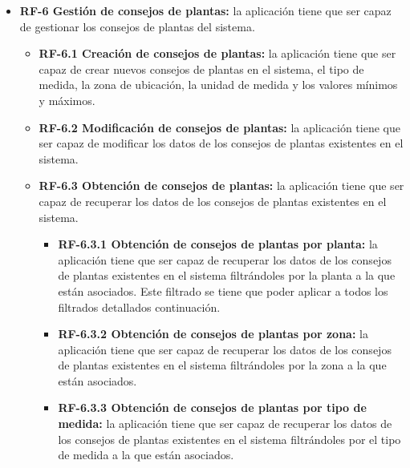 \begin{itemize}
        \item \textbf{RF-6 Gestión de consejos de plantas:} la aplicación tiene que ser capaz de gestionar los consejos de plantas del sistema.
            \begin{itemize}
                \item \textbf{RF-6.1 Creación de consejos de plantas:} la aplicación tiene que ser capaz de crear nuevos consejos de plantas en el sistema, el tipo de medida, la zona de ubicación,  la unidad de medida y los valores mínimos y máximos.
                \item \textbf{RF-6.2 Modificación de consejos de plantas:} la aplicación tiene que ser capaz de modificar los datos de los consejos de plantas existentes en el sistema.
    			\item \textbf{RF-6.3 Obtención de consejos de plantas:} la aplicación tiene que ser capaz de recuperar los datos de los consejos de plantas existentes en el sistema.
                \begin{itemize}
                    \item \textbf{RF-6.3.1 Obtención de consejos de plantas por planta:} la aplicación tiene que ser capaz de recuperar los datos de los consejos de plantas existentes en el sistema filtrándoles por la planta a la que están asociados. Este filtrado se tiene que poder aplicar a todos los filtrados detallados continuación. 
    				\item \textbf{RF-6.3.2 Obtención de consejos de plantas por zona:} la aplicación tiene que ser capaz de recuperar los datos de los consejos de plantas existentes en el sistema filtrándoles por la zona a la que están asociados.
    				\item \textbf{RF-6.3.3 Obtención de consejos de plantas por tipo de medida:} la aplicación tiene que ser capaz de recuperar los datos de los consejos de plantas existentes en el sistema filtrándoles por el tipo de medida a la que están asociados.
                \end{itemize}
            \end{itemize}
            

\end{itemize}
